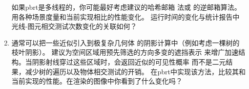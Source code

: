 \begin{enumerate}
          如果pbrt是多线程的，你可能最好考虑\citet{Benthin_2006}建议的哈希邮箱
          法或\citet{shevtsov2007ray}
          的逆邮箱算法。
          用各种场景度量和当前实现相比的性能变化。
          运行时间的变化与统计报告中光线-图元相交测试次数变化的关联如何？
    \item \circlethree 通常可以把一些近似引入到极复杂几何体
          的阴影计算中（例如考虑一棵树的枝叶阴影）。
          \citet{4634616}建议为空间区域用预先筛选的方向多变的遮挡表示
          来增广加速结构。当阴影射线穿过这些区域时，会返回近似的可见性概率
          而不是二元结果，减少树的遍历以及物体相交测试的开销。
          在pbrt中实现该方法，比较其和当前实现的性能。在渲染的图像中你看到了什么变化吗？
\end{enumerate}